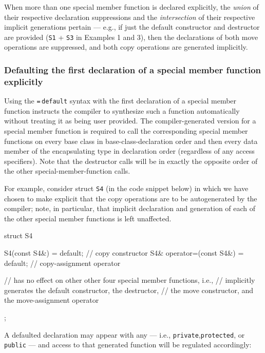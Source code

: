 When more than one special member function is declared explicitly, the
\emph{union} of their respective declaration suppressions and the
\emph{intersection} of their respective implicit generations pertain ---
e.g., if just the default constructor and destructor are provided
(\lstinline!S1! + \lstinline!S3! in Examples 1 and 3), then the declarations of both move
operations are suppressed, and both copy operations are generated
implicitly.

\subsubsection[Defaulting the first declaration of a special member function explicitly]{Defaulting the first declaration of a special member function explicitly}\label{defaulting-the-first-declaration-of-a-special-member-function-explicitly}

Using the \lstinline!=!\,\lstinline!default! syntax with the first declaration
of a special member function instructs the compiler to synthesize such a
function automatically without treating it as being
user provided. The compiler-generated version for a
special member function is required to call the corresponding special
member functions on every base class in base-class-declaration
order and then every data member of the encapsulating type in
declaration order (regardless of any access specifiers). Note that the
destructor calls will be in exactly the opposite order of the
  other special-member-function calls.

For example, consider struct \lstinline!S4! (in the code snippet below) in which we have chosen
to make explicit that the copy operations are to be autogenerated by
the compiler; note, in particular, that implicit declaration and generation
of each of the other special member functions is left unaffected.

\begin{emcppslisting}
struct S4
{
    S4(const S4&) = default;             // copy constructor
    S4& operator=(const S4&) = default;  // copy-assignment operator

    // has no effect on other other four special member functions, i.e.,
    // implicitly generates the default constructor, the destructor,
    // the move constructor, and the move-assignment operator
};
\end{emcppslisting}

\noindent A defaulted declaration may appear with any  ---
i.e., \lstinline!private!,\linebreak[4] \lstinline!protected!, or \lstinline!public! --- and access to that generated function will be regulated accordingly:

